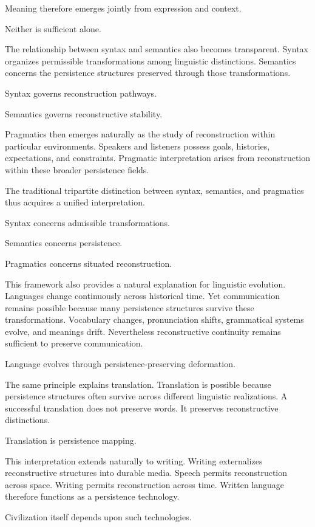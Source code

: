 \documentclass[12pt,oneside]{article}
\theoremstyle{definition}
\begin{document}
Meaning therefore emerges jointly from expression and context.

Neither is sufficient alone.

The relationship between syntax and semantics also becomes transparent. Syntax organizes permissible transformations among linguistic distinctions. Semantics concerns the persistence structures preserved through those transformations.

Syntax governs reconstruction pathways.

Semantics governs reconstructive stability.

Pragmatics then emerges naturally as the study of reconstruction within particular environments. Speakers and listeners possess goals, histories, expectations, and constraints. Pragmatic interpretation arises from reconstruction within these broader persistence fields.

The traditional tripartite distinction between syntax, semantics, and pragmatics thus acquires a unified interpretation.

Syntax concerns admissible transformations.

Semantics concerns persistence.

Pragmatics concerns situated reconstruction.

This framework also provides a natural explanation for linguistic evolution. Languages change continuously across historical time. Yet communication remains possible because many persistence structures survive these transformations. Vocabulary changes, pronunciation shifts, grammatical systems evolve, and meanings drift. Nevertheless reconstructive continuity remains sufficient to preserve communication.

Language evolves through persistence-preserving deformation.

The same principle explains translation. Translation is possible because persistence structures often survive across different linguistic realizations. A successful translation does not preserve words. It preserves reconstructive distinctions.

Translation is persistence mapping.

This interpretation extends naturally to writing. Writing externalizes reconstructive structures into durable media. Speech permits reconstruction across space. Writing permits reconstruction across time. Written language therefore functions as a persistence technology.

Civilization itself depends upon such technologies.
\end{document}
